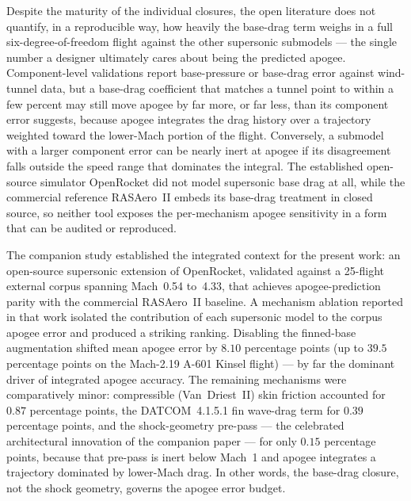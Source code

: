 Despite the maturity of the individual closures, the open literature does not
quantify, in a reproducible way, how heavily the base-drag term weighs in a full
six-degree-of-freedom flight against the other supersonic submodels --- the
single number a designer ultimately cares about being the predicted apogee.
Component-level validations report base-pressure or base-drag error against
wind-tunnel data, but a base-drag coefficient that matches a tunnel point to
within a few percent may still move apogee by far more, or far less, than its
component error suggests, because apogee integrates the drag history over a
trajectory weighted toward the lower-Mach portion of the flight. Conversely, a
submodel with a larger component error can be nearly inert at apogee if its
disagreement falls outside the speed range that dominates the integral. The
established open-source simulator OpenRocket \cite{niskanen2009} did not model
supersonic base drag at all, while the commercial reference RASAero~II
\cite{rogers2015} embeds its base-drag treatment in closed source, so neither
tool exposes the per-mechanism apogee sensitivity in a form that can be audited
or reproduced.

The companion study \cite{yu2026jsr} established the integrated context for the
present work: an open-source supersonic extension of OpenRocket, validated
against a 25-flight external corpus spanning Mach~0.54 to~4.33, that achieves
apogee-prediction parity with the commercial RASAero~II baseline. A mechanism
ablation reported in that work isolated the contribution of each supersonic
model to the corpus apogee error and produced a striking ranking. Disabling the
finned-base augmentation shifted mean apogee error by $8.10$ percentage points
(up to $39.5$ percentage points on the Mach-2.19 A-601 Kinsel flight) --- by far
the dominant driver of integrated apogee accuracy. The remaining mechanisms
were comparatively minor: compressible (Van~Driest~II) skin friction accounted
for $0.87$ percentage points, the DATCOM~4.1.5.1 fin wave-drag term for
$0.39$ percentage points, and the shock-geometry pre-pass --- the celebrated
architectural innovation of the companion paper --- for only $0.15$ percentage
points, because that pre-pass is inert below Mach~1 and apogee integrates a
trajectory dominated by lower-Mach drag. In other words, the base-drag closure,
not the shock geometry, governs the apogee error budget.

